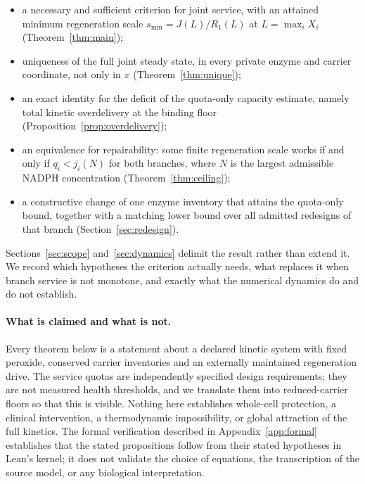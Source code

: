 \documentclass[11pt,a4paper]{article}
\theoremstyle{plain}
\theoremstyle{definition}
\theoremstyle{remark}
\begin{document}
\begin{itemize}
\item a necessary and sufficient criterion for joint service, with an attained
  minimum regeneration scale $s_{\min}=J(L)/R_1(L)$ at $L=\max_iX_i$
  (Theorem~\ref{thm:main});
\item uniqueness of the full joint steady state, in every private enzyme and
  carrier coordinate, not only in $x$ (Theorem~\ref{thm:unique});
\item an exact identity for the deficit of the quota-only capacity estimate,
  namely total kinetic overdelivery at the binding floor
  (Proposition~\ref{prop:overdelivery});
\item an equivalence for repairability: some finite regeneration scale works if and
  only if $q_i<j_i(N)$ for both branches, where $N$ is the largest admissible NADPH
  concentration (Theorem~\ref{thm:ceiling});
\item a constructive change of one enzyme inventory that attains the quota-only
  bound, together with a matching lower bound over all admitted redesigns of that
  branch (Section~\ref{sec:redesign}).
\end{itemize}

Sections~\ref{sec:scope} and~\ref{sec:dynamics} delimit the result rather than
extend it. We record which hypotheses the criterion actually needs, what replaces
it when branch service is not monotone, and exactly what the numerical dynamics do
and do not establish.

\paragraph{What is claimed and what is not.}
Every theorem below is a statement about a declared kinetic system with fixed
peroxide, conserved carrier inventories and an externally maintained regeneration
drive. The service quotas are independently specified design requirements; they are
not measured health thresholds, and we translate them into reduced-carrier floors
so that this is visible. Nothing here establishes whole-cell protection, a clinical
intervention, a thermodynamic impossibility, or global attraction of the full
kinetics. The formal verification described in Appendix~\ref{app:formal}
establishes that the stated propositions follow from their stated hypotheses in
Lean's kernel; it does not validate the choice of equations, the transcription of
the source model, or any biological interpretation.
\end{document}
